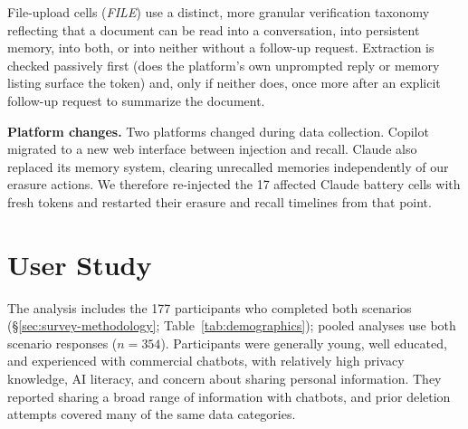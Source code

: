\documentclass[conference,compsoc]{IEEEtran}
\begin{document}
File-upload cells (\textit{FILE})
use a distinct, more granular verification taxonomy reflecting that a
document can be read into a conversation, into persistent memory, into
both, or into neither without a follow-up request. Extraction is
checked passively first (does the platform's own unprompted reply or
memory listing surface the token) and, only if neither does, once more
after an explicit follow-up request to summarize the document.

\textbf{Platform changes.} Two platforms changed during data collection. Copilot migrated to a new web interface between injection and recall. Claude also replaced its memory system, clearing unrecalled memories independently of our erasure actions. We therefore re-injected the 17 affected Claude battery cells with fresh tokens and restarted their erasure and recall timelines from that point.

\section{User Study}

\label{sec:sample-knowledge}

The analysis includes the 177 participants who completed both scenarios (\S\ref{sec:survey-methodology}; Table~\ref{tab:demographics}); pooled analyses use both scenario responses ($n=354$). Participants were generally young, well educated, and experienced with commercial chatbots, with relatively high privacy knowledge, AI literacy, and concern about sharing personal information. They reported sharing a broad range of information with chatbots, and prior deletion attempts covered many of the same data categories.
\end{document}
